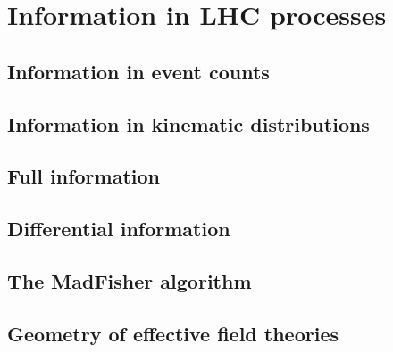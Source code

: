 \section{Information in LHC processes}
\label{sec:information_madfisher}

\subsection{Information in event counts}

\subsection{Information in kinematic distributions}

\subsection{Full information}

\subsection{Differential information}

\subsection{The MadFisher algorithm}

\subsection{Geometry of effective field theories}



